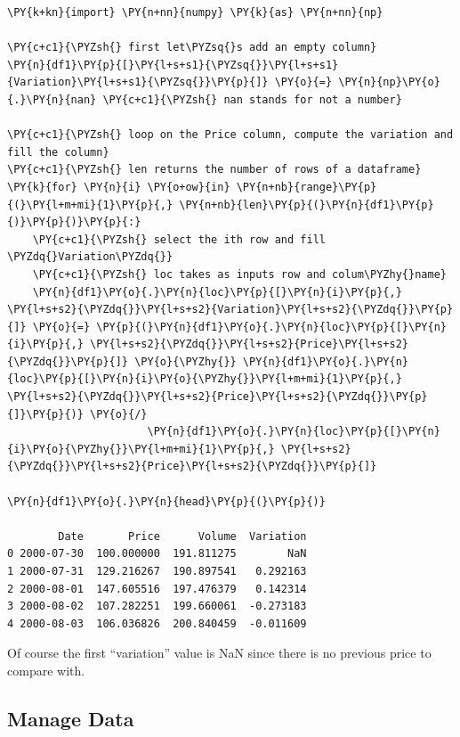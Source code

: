 \begin{tcolorbox}[breakable, size=fbox, boxrule=1pt, pad at break*=1mm,colback=cellbackground, colframe=cellborder]
\begin{Verbatim}[commandchars=\\\{\}]
\PY{k+kn}{import} \PY{n+nn}{numpy} \PY{k}{as} \PY{n+nn}{np}

\PY{c+c1}{\PYZsh{} first let\PYZsq{}s add an empty column}
\PY{n}{df1}\PY{p}{[}\PY{l+s+s1}{\PYZsq{}}\PY{l+s+s1}{Variation}\PY{l+s+s1}{\PYZsq{}}\PY{p}{]} \PY{o}{=} \PY{n}{np}\PY{o}{.}\PY{n}{nan} \PY{c+c1}{\PYZsh{} nan stands for not a number}

\PY{c+c1}{\PYZsh{} loop on the Price column, compute the variation and fill the column}
\PY{c+c1}{\PYZsh{} len returns the number of rows of a dataframe}
\PY{k}{for} \PY{n}{i} \PY{o+ow}{in} \PY{n+nb}{range}\PY{p}{(}\PY{l+m+mi}{1}\PY{p}{,} \PY{n+nb}{len}\PY{p}{(}\PY{n}{df1}\PY{p}{)}\PY{p}{)}\PY{p}{:}
    \PY{c+c1}{\PYZsh{} select the ith row and fill \PYZdq{}Variation\PYZdq{}}
    \PY{c+c1}{\PYZsh{} loc takes as inputs row and colum\PYZhy{}name}
    \PY{n}{df1}\PY{o}{.}\PY{n}{loc}\PY{p}{[}\PY{n}{i}\PY{p}{,} \PY{l+s+s2}{\PYZdq{}}\PY{l+s+s2}{Variation}\PY{l+s+s2}{\PYZdq{}}\PY{p}{]} \PY{o}{=} \PY{p}{(}\PY{n}{df1}\PY{o}{.}\PY{n}{loc}\PY{p}{[}\PY{n}{i}\PY{p}{,} \PY{l+s+s2}{\PYZdq{}}\PY{l+s+s2}{Price}\PY{l+s+s2}{\PYZdq{}}\PY{p}{]} \PY{o}{\PYZhy{}} \PY{n}{df1}\PY{o}{.}\PY{n}{loc}\PY{p}{[}\PY{n}{i}\PY{o}{\PYZhy{}}\PY{l+m+mi}{1}\PY{p}{,} \PY{l+s+s2}{\PYZdq{}}\PY{l+s+s2}{Price}\PY{l+s+s2}{\PYZdq{}}\PY{p}{]}\PY{p}{)} \PY{o}{/}
                      \PY{n}{df1}\PY{o}{.}\PY{n}{loc}\PY{p}{[}\PY{n}{i}\PY{o}{\PYZhy{}}\PY{l+m+mi}{1}\PY{p}{,} \PY{l+s+s2}{\PYZdq{}}\PY{l+s+s2}{Price}\PY{l+s+s2}{\PYZdq{}}\PY{p}{]}

\PY{n}{df1}\PY{o}{.}\PY{n}{head}\PY{p}{(}\PY{p}{)}

        Date       Price      Volume  Variation
0 2000-07-30  100.000000  191.811275        NaN
1 2000-07-31  129.216267  190.897541   0.292163
2 2000-08-01  147.605516  197.476379   0.142314
3 2000-08-02  107.282251  199.660061  -0.273183
4 2000-08-03  106.036826  200.840459  -0.011609
\end{Verbatim}
\end{tcolorbox}

Of course the first ``variation'' value is NaN since there is no previous price to compare with.

\subsection{Manage Data}\label{manage-data}

